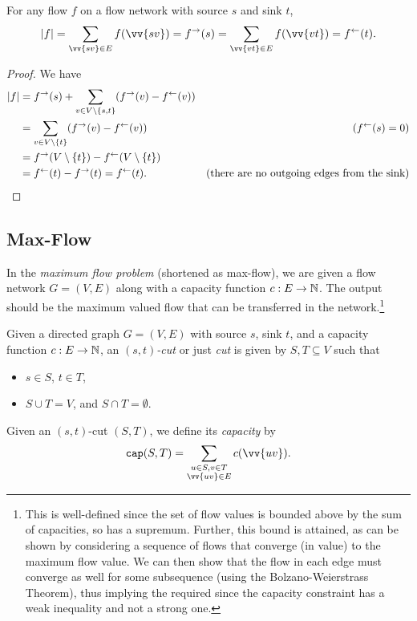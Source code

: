\begin{lemma}
	For any flow $f$ on a flow network with source $s$ and sink $t$,
	\[ |f| = \sum_{\vv{sv}\in E}f(\vv{sv}) = f^{\to}(s) = \sum_{\vv{vt}\in E}f(\vv{vt}) = f^{\ot}(t). \]
\end{lemma}
\begin{proof}
	We have
	\begin{align*}
		|f| &= f^{\to}(s) + \sum_{v\in V\setminus\{s,t\}} (f^\to(v) - f^\leftarrow(v)) \\
			&= \sum_{v\in V\setminus \{t\}} (f^\to(v) - f^\leftarrow(v)) & (f^\leftarrow(s)=0) \\
			&= f^\to(V\setminus\{t\}) - f^\leftarrow(V\setminus\{t\}) \\
			&= f^\leftarrow(t) - f^\to(t) = f^\leftarrow(t). & (\text{there are no outgoing edges from the sink})
	\end{align*}
\end{proof}

\subsection{Max-Flow}

In the \textit{maximum flow problem} (shortened as max-flow), we are given a flow network $G=(V,E)$ along with a capacity function $c:E\to\mathbb{N}$. The output should be the maximum valued flow that can be transferred in the network.\footnote{This is well-defined since the set of flow values is bounded above by the sum of capacities, so has a supremum. Further, this bound is attained, as can be shown by considering a sequence of flows that converge (in value) to the maximum flow value. We can then show that the flow in each edge must converge as well for some subsequence (using the Bolzano-Weierstrass Theorem), thus implying the required since the capacity constraint has a weak inequality and not a strong one.}

\begin{fdef}
	Given a directed graph $G=(V,E)$ with source $s$, sink $t$, and a capacity function $c:E\to\mathbb{N}$, an \textit{$(s,t)$-cut} or just \textit{cut} is given by $S,T\subseteq V$ such that
	\begin{itemize}
		\item $s\in S$, $t\in T$,
		\item $S\cup T=V$, and $S\cap T=\emptyset$.
	\end{itemize}
	Given an $(s,t)$-cut $(S,T)$, we define its \textit{capacity} by
	\[ \capp(S,T) = \sum_{\substack{u\in S, v\in T \\ \vv{uv}\in E}} c(\vv{uv}). \]
\end{fdef}

